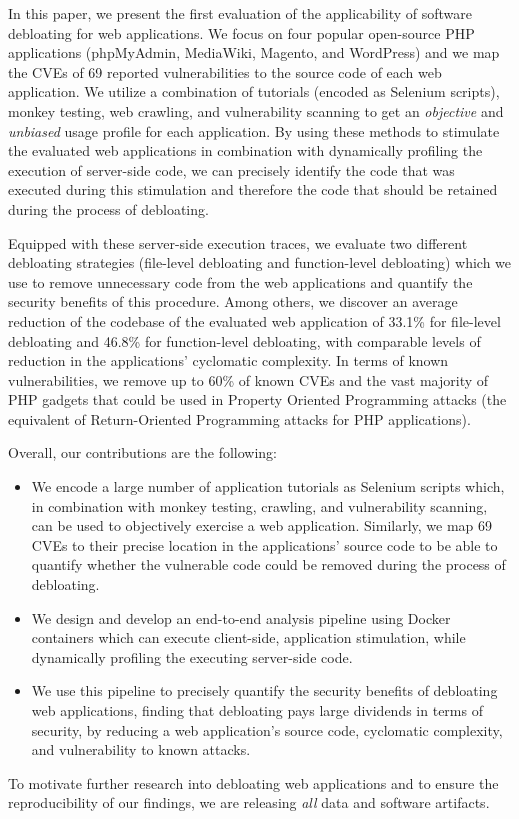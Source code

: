 In this paper, we present the first evaluation of the applicability of software
debloating for web applications. We focus on four popular open-source PHP
applications (phpMyAdmin, MediaWiki, Magento, and WordPress) and we map the CVEs of 69
reported vulnerabilities to the source code of each web application. We utilize
a combination of tutorials (encoded as Selenium scripts), monkey testing,
web crawling, and vulnerability scanning to get an \emph{objective} and \emph{
unbiased} usage profile for each application. By using
these methods to stimulate the evaluated web applications in combination with
dynamically profiling the execution of server-side code, we can precisely
identify the code that was executed during this stimulation and therefore
the code that should be retained during the process of debloating.

Equipped with these server-side execution traces, we evaluate two different
debloating strategies (file-level debloating and function-level debloating)
which we use to remove unnecessary code from the web applications and quantify
the security benefits of this procedure. Among others, we discover an average
reduction of the codebase of the evaluated web application of 33.1\% for
file-level debloating and 46.8\% for function-level debloating, with comparable
levels of reduction in the applications' cyclomatic complexity.
In terms of
known vulnerabilities, we remove up to 60\% of known CVEs and the vast majority
of PHP gadgets that could be used in Property Oriented Programming attacks
(the equivalent of Return-Oriented Programming attacks for PHP applications).

\noindent Overall, our contributions are the following:

\begin{itemize}
  \setlength\itemsep{0.5em}
\item We encode a large number of application tutorials as Selenium scripts which, in combination with monkey testing, crawling, and vulnerability scanning, can be used to objectively exercise a web application. Similarly, we map 69 CVEs to their precise location in the applications' source code to be able to quantify whether the vulnerable code could be removed during the process of debloating.

\item We design and develop an end-to-end analysis pipeline using Docker containers which can execute client-side, application stimulation, while dynamically profiling the executing server-side code.

\item We use this pipeline to precisely quantify the security benefits of debloating web applications, finding that debloating pays large dividends in terms of security, by reducing a web application's source code, cyclomatic complexity, and vulnerability to known attacks.

\end{itemize}

\noindent To motivate further research into debloating web applications and to ensure the reproducibility of our findings, we are releasing \emph{all} data and software artifacts.
